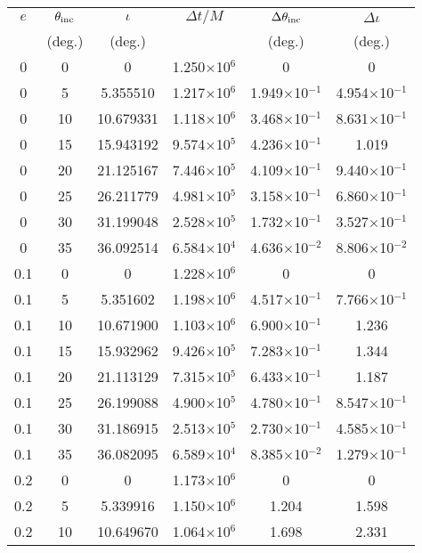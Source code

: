\documentclass[aps,prd,twocolumn,showpacs,groupedaddress,nofootinbib]{revtex4}
\newcommand\T{\rule{0pt}{3ex}}
\begin{document}
\begin{widetext}
\begin{table}
\begin{tabular}{|c|c|c|c|c|c|}
\hline
\T $e$ & $\theta_{\rm inc}$ & $\iota$ & $\Delta t/M$ & $\Delta \theta_{\rm inc}$ & $\Delta \iota$\\
  & (deg.) & (deg.) &  & (deg.) & (deg.)\\
\hline
\T  0& 0& 0 & 1.250$\times$10$^{6}$& 0& 0\\
  0& 5& 5.355510& 1.217$\times$10$^{6}$& 1.949$\times$10$^{-1}$& 4.954$\times$10$^{-1}$\\
  0& 10& 10.679331& 1.118$\times$10$^{6}$& 3.468$\times$10$^{-1}$& 8.631$\times$10$^{-1}$\\
  0& 15& 15.943192& 9.574$\times$10$^{5}$& 4.236$\times$10$^{-1}$& 1.019\\
  0& 20& 21.125167& 7.446$\times$10$^{5}$& 4.109$\times$10$^{-1}$& 9.440$\times$10$^{-1}$\\
  0& 25& 26.211779& 4.981$\times$10$^{5}$& 3.158$\times$10$^{-1}$& 6.860$\times$10$^{-1}$\\
  0& 30& 31.199048& 2.528$\times$10$^{5}$& 1.732$\times$10$^{-1}$& 3.527$\times$10$^{-1}$\\
  0& 35& 36.092514& 6.584$\times$10$^4$& 4.636$\times$10$^{-2}$& 8.806$\times$10$^{-2}$\\
\hline
\T  0.1&  0&  0&  1.228$\times$10$^{6}$&  0&  0\\
  0.1&  5&  5.351602&  1.198$\times$10$^{6}$&  4.517$\times$10$^{-1}$&  7.766$\times$10$^{-1}$\\
  0.1& 10& 10.671900&  1.103$\times$10$^{6}$&  6.900$\times$10$^{-1}$&  1.236\\
  0.1& 15& 15.932962&  9.426$\times$10$^{5}$&  7.283$\times$10$^{-1}$&  1.344\\
  0.1& 20& 21.113129&  7.315$\times$10$^{5}$&  6.433$\times$10$^{-1}$&  1.187\\
  0.1& 25& 26.199088&  4.900$\times$10$^{5}$&  4.780$\times$10$^{-1}$&  8.547$\times$10$^{-1}$\\
  0.1& 30& 31.186915&  2.513$\times$10$^{5}$&  2.730$\times$10$^{-1}$&  4.585$\times$10$^{-1}$\\
  0.1& 35& 36.082095&  6.589$\times$10$^4$&  8.385$\times$10$^{-2}$&  1.279$\times$10$^{-1}$\\
  0.2&  0&  0&  1.173$\times$10$^{6}$&  0&  0\\
  0.2&  5&  5.339916&  1.150$\times$10$^{6}$&  1.204&  1.598\\
  0.2& 10& 10.649670&  1.064$\times$10$^{6}$&  1.698&  2.331\\

\end{tabular}
\end{table}
\end{widetext}
\end{document}

